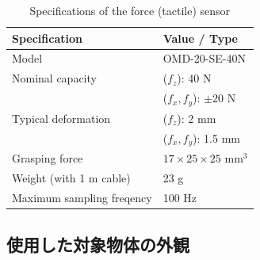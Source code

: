 \begin{table}[ht]
\caption{Specifications of the force (tactile) sensor}    
\centering
  \begin{tabular}{ll} \hline
    Specification & Value / Type \\ \hline 
    Model & OMD-20-SE-40N  \\ 
    Nominal capacity & ($f_z$): 40 N  \\
      & ($f_x,f_y$): $\pm$20 N  \\
    Typical deformation & ($f_z$): 2 mm  \\
      & ($f_x,f_y$): 1.5 mm  \\
    Grasping force & $17\times25\times25$ mm$^3$  \\  
    Weight (with 1 m cable) & 23 g   \\ 
    Maximum sampling freqency & 100 Hz   \\ \hline 
  \end{tabular}
  \label{tab:deformasion_3}
\end{table}

\clearpage

\subsection{使用した対象物体の外観}


